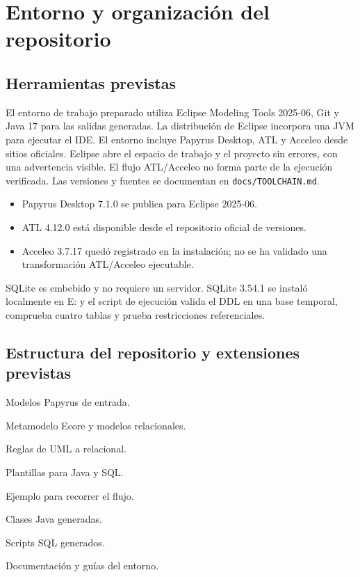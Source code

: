 \documentclass[12pt,a4paper,oneside]{report}
\begin{document}
\chapter{Entorno y organización del repositorio}
\section{Herramientas previstas}
El entorno de trabajo preparado utiliza Eclipse Modeling Tools 2025-06, Git y Java 17 para las salidas generadas. La distribución de Eclipse incorpora una JVM para ejecutar el IDE. El entorno incluye Papyrus Desktop, ATL y Acceleo desde sitios oficiales. Eclipse abre el espacio de trabajo y el proyecto sin errores, con una advertencia visible. El flujo ATL/Acceleo no forma parte de la ejecución verificada. Las versiones y fuentes se documentan en \texttt{docs/TOOLCHAIN.md}.

\begin{itemize}
  \item Papyrus Desktop 7.1.0 se publica para Eclipse 2025-06.
  \item ATL 4.12.0 está disponible desde el repositorio oficial de versiones.
  \item Acceleo 3.7.17 quedó registrado en la instalación; no se ha validado una transformación ATL/Acceleo ejecutable.
\end{itemize}

SQLite es embebido y no requiere un servidor. SQLite 3.54.1 se instaló localmente en E: y el script de ejecución valida el DDL en una base temporal, comprueba cuatro tablas y prueba restricciones referenciales.

\section{Estructura del repositorio y extensiones previstas}
\begin{description}[leftmargin=3.5cm,style=nextline]
  \item[\texttt{models/uml/}] Modelos Papyrus de entrada.
  \item[\texttt{models/relational/}] Metamodelo Ecore y modelos relacionales.
  \item[\texttt{transformations/atl/}] Reglas de UML a relacional.
  \item[\texttt{generator/acceleo/}] Plantillas para Java y SQL.
  \item[\texttt{examples/biblioteca/}] Ejemplo para recorrer el flujo.
  \item[\texttt{generated/java/}] Clases Java generadas.
  \item[\texttt{generated/sql/}] Scripts SQL generados.
  \item[\texttt{docs/}] Documentación y guías del entorno.
\end{description}
\end{document}
